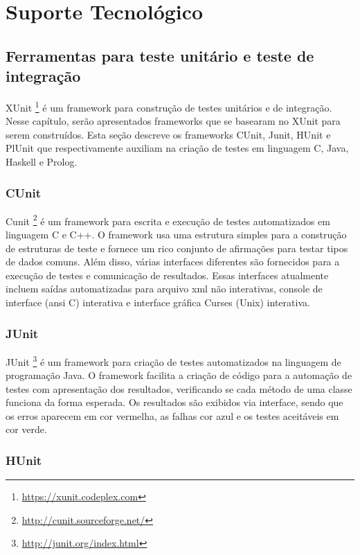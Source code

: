 \chapter{Suporte Tecnológico}

\section{Ferramentas para teste unitário e teste de integração}

XUnit \footnote{\url {https://xunit.codeplex.com}} é um framework para construção de testes unitários e de integração. Nesse capítulo, serão apresentados frameworks que se basearam no XUnit para serem construídos.
Esta seção descreve os frameworks CUnit, Junit, HUnit e PlUnit que respectivamente auxiliam na criação de testes em linguagem C, Java, Haskell e Prolog.

\subsection{CUnit}

Cunit \footnote{\url {http://cunit.sourceforge.net/}} é um framework para escrita e execução de testes automatizados em linguagem C e C++. O framework  usa uma estrutura simples para a construção de estruturas de teste  e fornece um rico conjunto de afirmações para testar tipos de dados comuns. Além disso, várias interfaces diferentes são fornecidos para a execução de testes e comunicação de resultados. Essas interfaces atualmente incluem saídas automatizadas para arquivo xml não interativas, console de interface (ansi C) interativa e interface gráfica Curses (Unix) interativa.

\subsection{JUnit}

JUnit \footnote{\url {http://junit.org/index.html}} é um framework para criação de testes automatizados na linguagem de programação Java. O framework facilita a criação de código para a automação de testes com apresentação dos resultados,  verificando se cada método de uma classe funciona da forma esperada. Os resultados são exibidos via interface, sendo que os erros aparecem em cor vermelha, as falhas cor azul e os testes aceitáveis em cor verde.

\subsection{HUnit}


